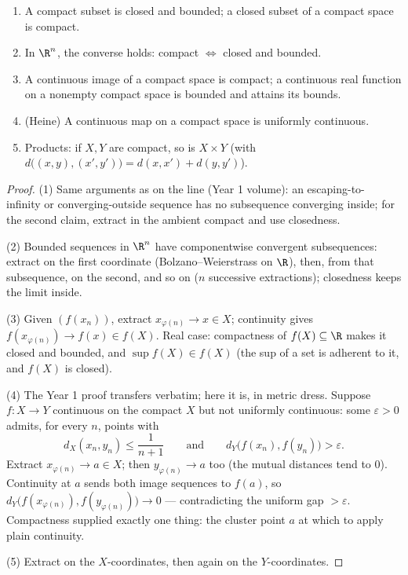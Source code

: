 \begin{theorem}\label{thm:b2:metric:compactprops}
\begin{enumerate}
  \item A compact subset is closed and bounded; a closed subset of a
        compact space is compact.
  \item In $\R^n$, the converse holds: compact $\iff$ closed and
        bounded.
  \item A continuous image of a compact space is compact; a
        continuous real function on a nonempty compact space is
        bounded and attains its bounds.
  \item (Heine) A continuous map on a compact space is uniformly
        continuous.
  \item Products: if $X, Y$ are compact, so is $X \times Y$ (with
        $d\bigl((x,y),(x',y')\bigr) = d(x,x') + d(y,y')$).
\end{enumerate}
\end{theorem}

\begin{proof}
(1) Same arguments as on the line (Year 1 volume): an escaping-to-%
infinity or converging-outside sequence has no subsequence
converging inside; for the second claim, extract in the ambient
compact and use closedness.

(2) Bounded sequences in $\R^n$ have componentwise convergent
subsequences: extract on the first coordinate
(Bolzano--Weierstrass on $\R$), then, from that subsequence, on the
second, and so on ($n$ successive extractions); closedness keeps
the limit inside.

(3) Given $(f(x_n))$, extract $x_{\varphi(n)} \to x \in X$;
continuity gives $f(x_{\varphi(n)}) \to f(x) \in f(X)$. Real case:
compactness of $f(X) \subseteq \R$ makes it closed and bounded, and
$\sup f(X) \in f(X)$ (the sup of a set is adherent to it, and
$f(X)$ is closed).

(4) The Year 1 proof transfers verbatim; here it is, in metric
dress. Suppose $f \colon X \to Y$ continuous on the compact $X$
but not uniformly continuous: some $\varepsilon > 0$ admits, for
every $n$, points with
\[
d_X(x_n, y_n) \leq \frac{1}{n+1}
\qquad\text{and}\qquad
d_Y\bigl(f(x_n), f(y_n)\bigr) > \varepsilon .
\]
Extract $x_{\varphi(n)} \to a \in X$; then $y_{\varphi(n)} \to
a$ too (the mutual distances tend to $0$). Continuity at $a$
sends both image sequences to $f(a)$, so
$d_Y\bigl(f(x_{\varphi(n)}), f(y_{\varphi(n)})\bigr) \to 0$ ---
contradicting the uniform gap $> \varepsilon$. Compactness
supplied exactly one thing: the cluster point $a$ at which to
apply plain continuity.

(5) Extract on the $X$-coordinates, then again on the
$Y$-coordinates.
\end{proof}

